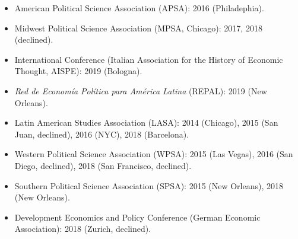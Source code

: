 \begin{itemize}
\item American Political Science Association (APSA): 2016 (Philadephia).
\item Midwest Political Science Association (MPSA, Chicago): 2017, 2018 (declined).
\item International Conference (Italian Association for the History of Economic Thought, AISPE): 2019 (Bologna).
\item \emph{Red de Econom\'ia Pol\'itica para Am\'erica Latina} (REPAL): 2019 (New Orleans).
\item Latin American Studies Association (LASA): 2014 (Chicago), 2015 (San Juan, declined), 2016 (NYC), 2018 (Barcelona).
\item Western Political Science Association (WPSA): 2015 (Las Vegas), 2016 (San Diego, declined), 2018 (San Francisco, declined).
\item Southern Political Science Association (SPSA): 2015 (New Orleans), 2018 (New Orleans).
\item Development Economics and Policy Conference (German Economic Association): 2018 (Zurich, declined).
\end{itemize}

